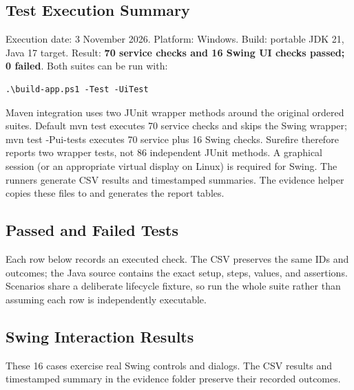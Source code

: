 \subsection{Test Execution Summary}
Execution date: 3 November 2026. Platform: Windows. Build: portable JDK 21, Java 17 target. Result: \textbf{70 service checks and 16 Swing UI checks passed; 0 failed}. Both suites can be run with:
\begin{verbatim}
.\build-app.ps1 -Test -UiTest
\end{verbatim}
Maven integration uses two JUnit wrapper methods around the original ordered suites. Default mvn test executes 70 service checks and skips the Swing wrapper; mvn test -Pui-tests executes 70 service plus 16 Swing checks. Surefire therefore reports two wrapper tests, not 86 independent JUnit methods. A graphical session (or an appropriate virtual display on Linux) is required for Swing. The runners generate CSV results and timestamped summaries. The evidence helper copies these files to  and generates the report tables.
\subsection{Passed and Failed Tests}
Each row below records an executed check. The CSV preserves the same IDs and outcomes; the Java source contains the exact setup, steps, values, and assertions. Scenarios share a deliberate lifecycle fixture, so run the whole suite rather than assuming each row is independently executable.

\subsection{Swing Interaction Results}
These 16 cases exercise real Swing controls and dialogs. The CSV results and timestamped summary in the evidence folder preserve their recorded outcomes.

